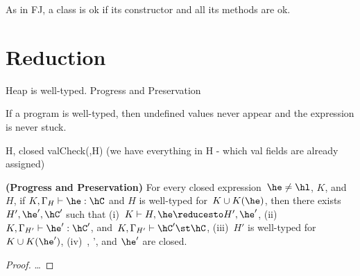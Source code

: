 \documentclass[9pt,a4paper]{article}
\begin{document}
As in FJ, a class is ok if its constructor  and all its methods are ok.


\section{Reduction}
Heap is well-typed.
Progress and Preservation

If a program is well-typed, then undefined values never appear and the expression is never stuck.


H, \he closed
valCheck(\he,H)  (we have everything in H - which val fields are already assigned)



\begin{Theorem}[preservation]
  \textbf{(Progress and Preservation)}
    For every closed expression~$\he \neq \hl$, $K$, and $H$,
        if $K,\Gamma_{H} \vdash \he : \hC$ and $H$ is well-typed for~$K \cup K(\he)$,
        then there exists~$H',\he',\hC'$ such that
        (i)~$K \vdash H,\he \reducesto H',\he'$,
        (ii)~$K,\Gamma_{H'} \vdash \he':\hC'$,
        and~$K,\Gamma_{H'} \vdash \hC' \st \hC$,
        (iii)~$H'$ is well-typed for~$K \cup K(\he')$,
        (iv)~\hC, \hC', and $\he'$ are closed.
\end{Theorem}
\begin{proof}
\ldots
\end{proof}
\end{document}
